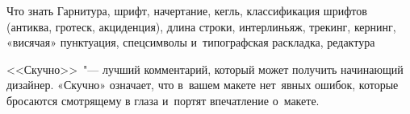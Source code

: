 
\begin{attentionbox}{Что знать}
	Гарнитура, шрифт, начертание, кегль, классификация шрифтов
	(антиква, гротеск, акциденция), длина строки, интерлиньяж,
	трекинг, кернинг, «висячая» пунктуация, спецсимволы и~типографская
	раскладка, редактура
\end{attentionbox}

\begin{definition}
	<<Скучно>>~"--- лучший комментарий, который может получить
	начинающий дизайнер. «Скучно» означает, что в~вашем макете
	нет~явных ошибок, которые бросаются смотрящему в глаза и~портят
	впечатление о~макете. 
\end{definition}


\begin{codebox}
	\inputminted{html}{code/html_1.html}
\end{codebox}




